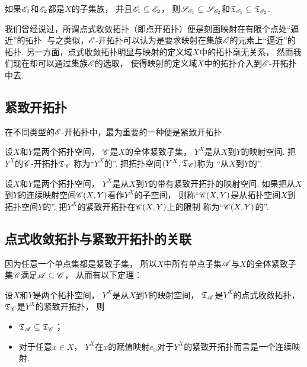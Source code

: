 \begin{proposition}
如果\(\mathscr{E}_1\)和\(\mathscr{E}_2\)都是\(X\)的子集族，
并且\(\mathscr{E}_1 \subseteq \mathscr{E}_2\)，
则\(\mathscr{S}_{\mathscr{E}_1} \subseteq \mathscr{S}_{\mathscr{E}_2}\)和\({\mathfrak T}_{\mathscr{E}_1} \subseteq {\mathfrak T}_{\mathscr{E}_2}\).
\end{proposition}

我们曾经说过，所谓点式收敛拓扑（即点开拓扑）便是刻画映射在有限个点处“逼近”的拓扑.
与之类似，\(\mathscr{E}\)-开拓扑可以认为是要求映射在集族\(\mathscr{E}\)的元素上“逼近”的拓扑.
另一方面，点式收敛拓扑明显与映射的定义域\(X\)中的拓扑毫无关系，
然而我们现在却可以通过集族\(\mathscr{E}\)的选取，
使得映射的定义域\(X\)中的拓扑介入到\(\mathscr{E}\)-开拓扑中去.

\subsection{紧致开拓扑}
在不同类型的\(\mathscr{E}\)-开拓扑中，最为重要的一种便是紧致开拓扑.
\begin{definition}
设\(X\)和\(Y\)是两个拓扑空间，
\(\mathscr{C}\)是\(X\)的全体紧致子集，
\(Y^X\)是从\(X\)到\(Y\)的映射空间.
把\(Y^X\)的\(\mathscr{C}\)-开拓扑\({\mathfrak T}_{\mathscr{C}}\)
称为“\(Y^X\)的”.
把拓扑空间\((Y^X,{\mathfrak T}_{\mathscr{C}})\)称为
“从\(X\)到\(Y\)的”.
\end{definition}

\begin{definition}
设\(X\)和\(Y\)是两个拓扑空间，
\(Y^X\)是从\(X\)到\(Y\)的带有紧致开拓扑的映射空间.
如果把从\(X\)到\(Y\)的连续映射空间\(\mathscr{C}(X,Y)\)看作\(Y^X\)的子空间，
则称“\(\mathscr{C}(X,Y)\)是从拓扑空间\(X\)到拓扑空间\(Y\)的”.
把\(Y^X\)的紧致开拓扑在\(\mathscr{C}(X,Y)\)上的限制
称为“\(\mathscr{C}(X,Y)\)的”.
\end{definition}

\subsection{点式收敛拓扑与紧致开拓扑的关联}
因为任意一个单点集都是紧致子集，
所以\(X\)中所有单点子集\(\mathscr{A}\)与\(X\)的全体紧致子集\(\mathscr{C}\)满足\(\mathscr{A} \subseteq \mathscr{C}\)，
从而有以下定理：
\begin{theorem}
设\(X\)和\(Y\)是两个拓扑空间，
\(Y^X\)是从\(X\)到\(Y\)的映射空间，
\({\mathfrak T}_{\mathscr{A}}\)是\(Y^X\)的点式收敛拓扑，
\({\mathfrak T}_{\mathscr{C}}\)是\(Y^X\)的紧致开拓扑，
则\begin{itemize}
	\item \({\mathfrak T}_{\mathscr{A}} \subseteq {\mathfrak T}_{\mathscr{C}}\)；
	\item 对于任意\(x \in X\)，
	\(Y^X\)在\(x\)的赋值映射\(e_x\)对于\(Y^X\)的紧致开拓扑而言是一个连续映射.
\end{itemize}
\end{theorem}

